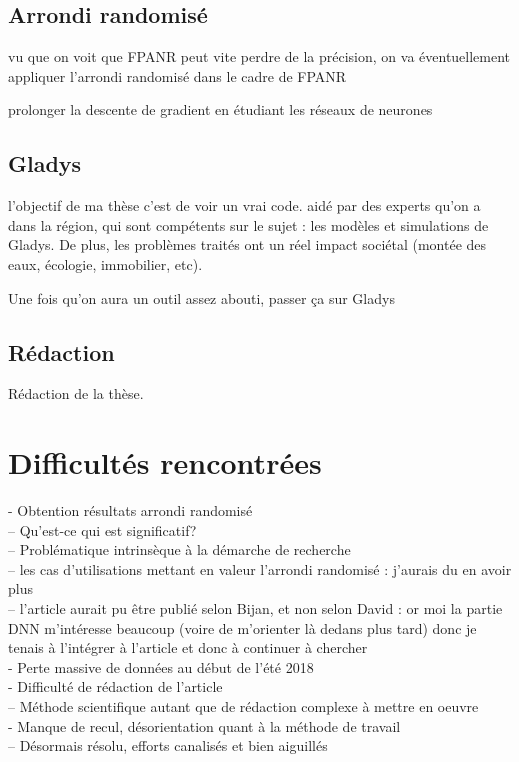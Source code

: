 \documentclass[a4paper,11pt]{article}
\begin{document}
\subsection{Arrondi randomisé}
vu que on voit que FPANR peut vite perdre de la précision, on va éventuellement appliquer l’arrondi randomisé dans le cadre de FPANR

prolonger la descente de gradient en étudiant les réseaux de neurones


\subsection{Gladys}
l’objectif de ma thèse c’est de voir un vrai code. aidé par des experts qu’on a dans la région, qui sont compétents sur le sujet : les modèles et simulations de Gladys.
De plus, les problèmes traités ont un réel impact sociétal (montée des eaux, écologie, immobilier, etc).

Une fois qu’on aura un outil assez abouti, passer ça sur Gladys
\subsection{Rédaction}
Rédaction de la thèse.

\section{Difficultés rencontrées}




- Obtention résultats arrondi randomisé\\
-- Qu’est-ce qui est significatif? \\
-- Problématique intrinsèque à la démarche de recherche\\
-- les cas d’utilisations mettant en valeur l’arrondi randomisé : j’aurais du en avoir plus\\
-- l’article aurait pu être publié selon Bijan, et non selon David : or moi la partie DNN m’intéresse beaucoup (voire de m’orienter là dedans plus tard) donc je tenais à l’intégrer à l’article et donc à continuer à chercher\\
- Perte massive de données au début de l’été 2018\\
- Difficulté de rédaction de l’article\\
-- Méthode scientifique autant que de rédaction complexe à mettre en oeuvre\\
- Manque de recul, désorientation quant à la méthode de travail\\
-- Désormais résolu, efforts canalisés et bien aiguillés\\


{}

\end{document}
